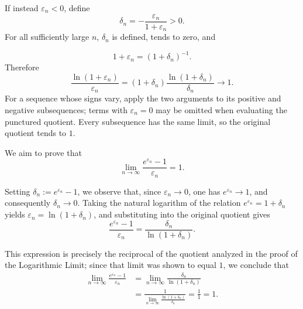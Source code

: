 \begin{remark}
If instead $\varepsilon_n<0$, define
\[
\delta_n=-\frac{\varepsilon_n}{1+\varepsilon_n}>0.
\]
For all sufficiently large $n$, $\delta_n$ is defined, tends to zero, and

\[
1+\varepsilon_n=(1+\delta_n)^{-1}.
\] Therefore
\[
\frac{\ln(1+\varepsilon_n)}{\varepsilon_n}
=(1+\delta_n)\frac{\ln(1+\delta_n)}{\delta_n}\longrightarrow1.
\]
For a sequence whose signs vary, apply the two arguments to its positive
and negative subsequences; terms with $\varepsilon_n=0$ may be omitted
when evaluating the punctured quotient. Every subsequence has the same
limit, so the original quotient tends to $1$.

\end{remark}

\begin{remark}

We aim to prove that
\[
\lim_{n \to \infty} \frac{e^{\varepsilon_n} - 1}{\varepsilon_n} = 1.
\]

Setting $\delta_n := e^{\varepsilon_n} - 1$, we observe that, since $\varepsilon_n \to 0$, one has $e^{\varepsilon_n} \to 1$, and consequently $\delta_n \to 0$. Taking the natural logarithm of the relation $e^{\varepsilon_n} = 1 + \delta_n$ yields $\varepsilon_n = \ln(1+\delta_n)$, and substituting into the original quotient gives
\[
\frac{e^{\varepsilon_n} - 1}{\varepsilon_n} = \frac{\delta_n}{\ln(1+\delta_n)}.
\]

This expression is precisely the reciprocal of the quotient analyzed in the proof of the Logarithmic Limit; since that limit was shown to equal $1$, we conclude that
\[
\begin{aligned}
\lim_{n \to \infty} \frac{e^{\varepsilon_n} - 1}{\varepsilon_n}
&= \lim_{n \to \infty} \frac{\delta_n}{\ln(1+\delta_n)} \\
&= \frac{1}{\displaystyle \lim_{n \to \infty} \frac{\ln(1+\delta_n)}{\delta_n}}
= \frac{1}{1} = 1.
\end{aligned}
\]

\end{remark}

